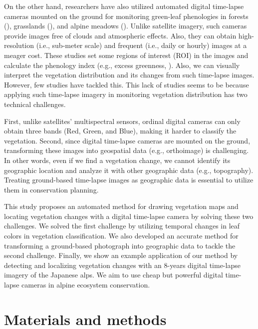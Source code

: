 \documentclass{article}
\begin{document}
On the other hand, researchers have also utilized automated digital time-lapse cameras mounted on the ground for monitoring green-leaf phenologies in forests (\cite{Richardson2009EcolAppl}), grasslands (\cite{Browning2017RemSen}), and alpine meadows (\cite{IdeOguma2013EcolInfom}). Unlike satellite imagery, such cameras provide images free of clouds and atmospheric effects. Also, they can obtain high-resolution (i.e., sub-meter scale) and frequent (i.e., daily or hourly) images at a meager cost. These studies set some regions of interest (ROI) in the images and calculate the phenology index (e.g., excess greenness, \cite{Woebbecke1995ASAE}). Also, we can visually interpret the vegetation distribution and its changes from such time-lapse images. However, few studies have tackled this. This lack of studies seems to be because applying such time-lapse imagery in monitoring vegetation distribution has two technical challenges.

First, unlike satellites' multispectral sensors, ordinal digital cameras can only obtain three bands (Red, Green, and Blue), making it harder to classify the vegetation. Second, since digital time-lapse cameras are mounted on the ground, transforming these images into geospatial data (e.g., orthoimage) is challenging. In other words, even if we find a vegetation change, we cannot identify its geographic location and analyze it with other geographic data (e.g., topography). Treating ground-based time-lapse images as geographic data is essential to utilize them in conservation planning.

This study proposes an automated method for drawing vegetation maps and locating vegetation changes with a digital time-lapse camera by solving these two challenges. We solved the first challenge by utilizing temporal changes in leaf colors in vegetation classification. We also developed an accurate method for transforming a ground-based photograph into geographic data to tackle the second challenge. Finally, we show an example application of our method by detecting and localizing vegetation changes with an 8-years digital time-lapse imagery of the Japanese alps. We aim to use cheap but powerful digital time-lapse cameras in alpine ecosystem conservation.

\hypertarget{materials-and-methods}{%
\section{Materials and methods}\label{materials-and-methods}}
\end{document}

